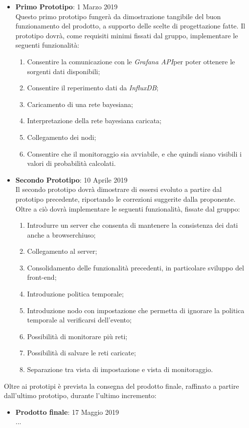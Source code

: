 \begin{itemize}
	\item \textbf{Primo Prototipo}: 1 Marzo 2019\\
	Questo primo prototipo fungerà da dimostrazione tangibile del buon funzionamento del prodotto, a supporto
	delle scelte di progettazione fatte. Il prototipo dovrà, come requisiti minimi fissati dal gruppo, implementare le seguenti funzionalità:
	\begin{enumerate}	%
		\item Consentire la comunicazione con le \textit{Grafana API}\glossario per poter ottenere le sorgenti dati disponibili;
		\item Consentire il reperimento dati da \textit{InfluxDB}\glossario;
		\item Caricamento di una rete bayesiana;
		\item Interpretazione della rete bayesiana caricata;
		\item Collegamento dei nodi;
		\item Consentire che il monitoraggio sia avviabile, e che quindi siano visibili i valori di probabilità calcolati.
	\end{enumerate}
	\item \textbf{Secondo Prototipo}: 10 Aprile 2019\\
	Il secondo prototipo dovrà dimostrare di essersi evoluto a partire dal prototipo precedente, riportando le correzioni suggerite dalla proponente. Oltre a ciò dovrà implementare le seguenti funzionalità, fissate dal gruppo:
	\begin{enumerate} %
		\item Introdurre un server che consenta di mantenere la consistenza dei dati anche a browser\glossario chiuso;
		\item Collegamento al server;
		\item Consolidamento delle funzionalità precedenti, in particolare sviluppo del front-end;
		\item Introduzione politica temporale;
		\item Introduzione nodo con impostazione che permetta di ignorare la politica temporale al verificarsi dell'evento;
		\item Possibilità di monitorare più reti;
		\item Possibilità di salvare le reti caricate;
		\item Separazione tra vista di impostazione e vista di monitoraggio.
	\end{enumerate}
\end{itemize}
Oltre ai prototipi è prevista la consegna del prodotto finale, raffinato a partire dall'ultimo prototipo, durante l'ultimo incremento:
\begin{itemize}
	\item \textbf{Prodotto finale}: 17 Maggio 2019\\
	...
\end{itemize}



